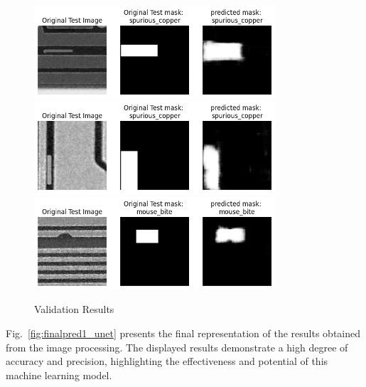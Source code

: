 \documentclass[12pt]{article}
\begin{document}
\begin{figure}[h]
    \centering
    \includegraphics[width=0.8\textwidth]{./graphics/output4.png}
    \includegraphics[width=0.8\textwidth]{./graphics/output5.png}
    \includegraphics[width=0.8\textwidth]{./graphics/output6.png}
    \caption{Validation Results}
    \label{fig:results2_unet}
\end{figure}

\clearpage

Fig.~\ref{fig:finalpred1_unet} presents the final representation of the results obtained from the image processing. The displayed results demonstrate a high degree of accuracy and precision, highlighting the effectiveness and potential of this machine learning model.
\end{document}
